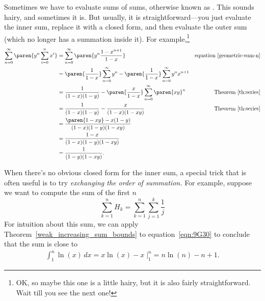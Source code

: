 Sometimes we have to evaluate sums of sums, otherwise known as
.  This sounds hairy, and sometimes it is.
But usually, it is straightforward---you just evaluate the inner sum,
replace it with a closed form, and then evaluate the outer sum (which
no longer has a summation inside it).  For example,\footnote{OK, so
  maybe this one is a little hairy, but it is also fairly
  straightforward.  Wait till you see the next one!}
\begingroup
{}
\begin{align*}
\sum_{n=0}^{\infty} \paren{y^n \sum_{i=0}^n x^i}
 & = \sum_{n=0}^{\infty} \paren{y^n \frac{1-x^{n+1}}{1-x}}
     & \text{equation~\ref{geometric-sum-n}}\\
%
 & = \paren{\frac{1}{1-x}} \sum_{n=0}^{\infty} y^n
     - \paren{\frac{1}{1-x}} \sum_{n=0}^{\infty} y^nx^{n+1} \\
%
 & = \frac{1}{(1-x)(1-y)}
    - \paren{\frac{x}{1 - x}} \sum_{n=0}^{\infty} \paren{xy}^n
      & \text{Theorem~\ref{th:series}}\\
%
 & = \frac{1}{(1-x)(1-y)} - \frac{x}{(1-x)(1-xy)}
      & \text{Theorem~\ref{th:series}}\\
%
  & = \frac{\paren{1-xy} - x(1-y)}{(1-x)(1-y)(1-xy)}\\
%
  & = \frac{1-x}{(1-x)(1-y)(1-xy)}\\
%
  & = \frac{1}{(1-y)(1-xy)}.
\end{align*}
\endgroup

When there's no obvious closed form for the inner sum, a special trick
that is often useful is to try \emph{exchanging the order of
  summation.}  For example, suppose we want to compute the sum of the
first $n$~
\begin{equation}\label{eqn:9B}
    \sum_{k=1}^n H_k = \sum_{k=1}^n \sum_{j=1}^k \frac{1}{j}
\end{equation}
For intuition about this sum, we can apply Theorem~\ref{weak_increasing_sum_bounds} to
equation~\ref{eqn:9G30} to conclude that the sum is close to
\begin{align*}
\int_{1}^n \ln(x) \, dx
    =  x \ln(x) - x \; \Bigr|_1^n %
    = n \ln(n) - n + 1.
\end{align*}

